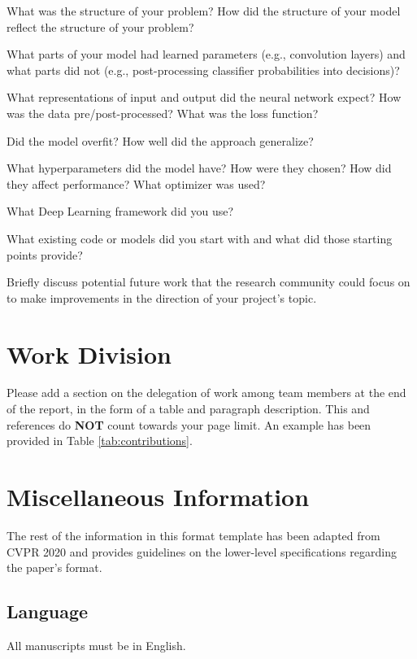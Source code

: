 \documentclass[10pt,twocolumn,letterpaper]{article}
\begin{document}
What was the structure of your problem? How did the structure of your model reflect the structure of your problem? 

What parts of your model had learned parameters (e.g., convolution layers) and what parts did not (e.g., post-processing classifier probabilities into decisions)? 

What representations of input and output did the neural network expect? How was the data pre/post-processed?
What was the loss function? 

Did the model overfit? How well did the approach generalize? 

What hyperparameters did the model have? How were they chosen? How did they affect performance? What optimizer was used? 

What Deep Learning framework did you use? 

What existing code or models did you start with and what did those starting points provide? 

Briefly discuss potential future work that the research community could focus on to make improvements in the direction of your project's topic.



\section{Work Division}

Please add a section on the delegation of work among team members at the end of the report, in the form of a table and paragraph description. This and references do \textbf{NOT} count towards your page limit. An example has been provided in Table \ref{tab:contributions}.

\newpage
\newpage
\section{Miscellaneous Information}

The rest of the information in this format template has been adapted from CVPR 2020 and provides guidelines on the lower-level specifications regarding the paper's format.

\subsection{Language}

All manuscripts must be in English.
\end{document}
